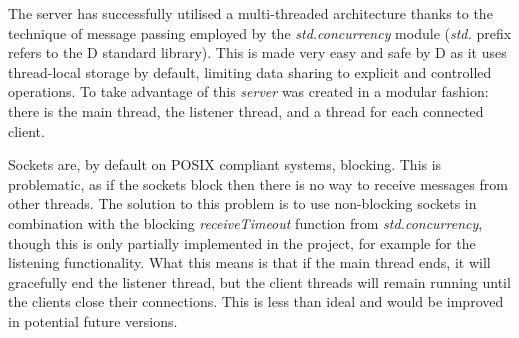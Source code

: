 \documentclass[a4paper]{article}
\begin{document}
The server has successfully utilised a multi-threaded architecture thanks to the technique of message passing employed by the \textit{std.concurrency} module (\textit{std.} prefix refers to the D standard library). This is made very easy and safe by D as it uses thread-local storage by default, limiting data sharing to explicit and controlled operations. To take advantage of this \textit{server} was created in a modular fashion: there is the main thread, the listener thread, and a thread for each connected client.

Sockets are, by default on POSIX compliant systems, blocking. This is problematic, as if the sockets block then there is no way to receive messages from other threads. The solution to this problem is to use non-blocking sockets in combination with the blocking \textit{receiveTimeout} function from \textit{std.concurrency}, though this is only partially implemented in the project, for example for the listening functionality. What this means is that if the main thread ends, it will gracefully end the listener thread, but the client threads will remain running until the clients close their connections. This is less than ideal and would be improved in potential future versions.




\printbibliography
\end{document}
